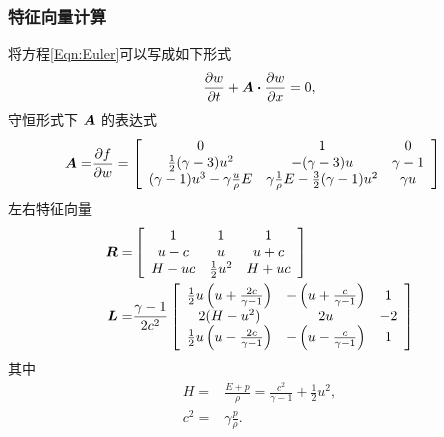 \documentclass[10.5pt
]{article}
\begin{document}
\subsubsection{特征向量计算}\label{Appendix}
将方程\ref{Eqn:Euler}可以写成如下形式
\begin{align}
\frac{\partial w}{\partial t} + \vb*A \vdot \frac{\partial w}{\partial
x}= 0,\label{Eqn:Euler2}
\end{align}
守恒形式下 $\vb*A$ 的表达式
\begin{align*}
\vb*A =& \frac{\partial f}{\partial w} = \left[\begin{array}{ccc} 0 & 1 & 0
\\
\frac{1}{2} (\gamma  - 3) u^2 & -(\gamma - 3) u & \gamma - 1
\\
(\gamma - 1) u^3 - \gamma \frac{u}{\rho} E & \gamma \frac{1}{\rho} E-\frac{3}{2} (\gamma
- 1) u^2 & \gamma u
\end{array}
\right]
\end{align*}
左右特征向量
\begin{align*}
\vb*R =& \left[\begin{array}{ccc} 1 & 1 & 1
\\
u - c & u & u + c
\\
H - u c & \frac{1}{2} u^2 & H + u c
\end{array}
\right]
\\
\vb*L =& \frac{\gamma - 1}{2 c^2} \left[\begin{array}{ccc} \frac{1}{2} u \left(u + \frac{2
c}{\gamma - 1}\right) & -\left(u + \frac{c}{\gamma - 1}\right) & 1
\\
2(H - u^2) & 2 u & - 2
\\
\frac{1}{2} u \left(u - \frac{2 c}{\gamma - 1}\right) & -\left(u - \frac{c}{\gamma -
1}\right) & 1
\end{array}
\right]
\end{align*}
其中
\begin{align*}
H =& \frac{E + p}{\rho} = \frac{c^2}{\gamma - 1} + \frac{1}{2} u^2,
\\
c^2 =& \gamma \frac{p}{\rho}.
\end{align*}
\end{document}
